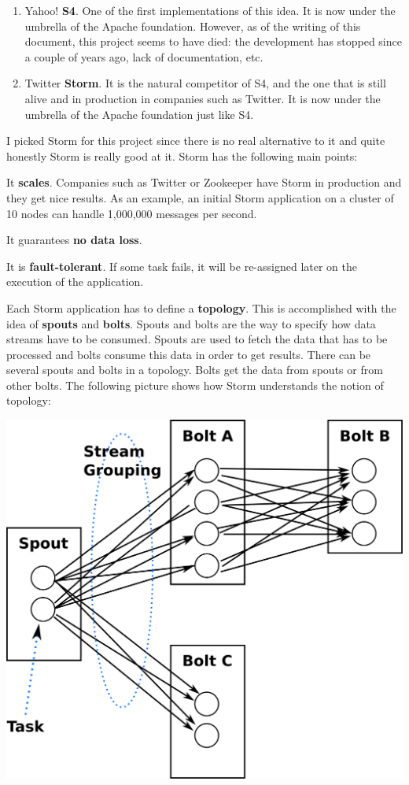 \begin{enumerate}
  \itemsep0em
  \item Yahoo! {\bf S4}. One of the first implementations of this idea. It is
now under the umbrella of the Apache foundation. However, as of the writing of
this document, this project seems to have died: the development has stopped
since a couple of years ago, lack of documentation, etc.
  \item Twitter {\bf Storm}. It is the natural competitor of S4, and the one
that is still alive and in production in companies such as Twitter. It is now
under the umbrella of the Apache foundation just like S4.
\end{enumerate}

I picked Storm for this project since there is no real alternative to it and
quite honestly Storm is really good at it. Storm has the following main points:

\mylist
  \item It {\bf scales}. Companies such as Twitter or Zookeeper have Storm in
production and they get nice results. As an example, an initial Storm
application on a cluster of 10 nodes can handle 1,000,000 messages per second.
  \item It guarantees {\bf no data loss}.
  \item It is {\bf fault-tolerant}. If some task fails, it will be re-assigned
later on the execution of the application.
\mylistend

Each Storm application has to define a {\bf topology}. This is accomplished
with the idea of {\bf spouts} and {\bf bolts}. Spouts and bolts are the way to
specify how data streams have to be consumed. Spouts are used to fetch the data
that has to be processed and bolts consume this data in order to get results.
There can be several spouts and bolts in a topology. Bolts get the data from
spouts or from other bolts. The following picture shows how Storm understands
the notion of topology:

\begin{center}
  \includegraphics[scale=0.25]{overview/images/storm.png}
\end{center}
